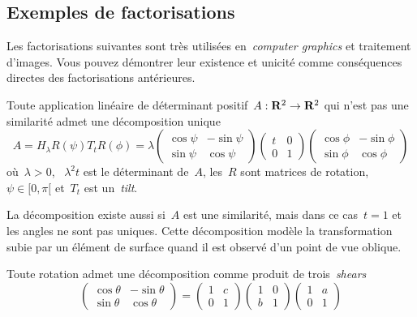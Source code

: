 \subsection{Exemples de factorisations}

Les factorisations suivantes sont très utilisées en~\emph{computer graphics}
et traitement d'images.  Vous pouvez démontrer leur existence et unicité
comme conséquences directes des factorisations antérieures.

\begin{proposition}
	Toute application linéaire de déterminant positif~$A:\mathbf{R}^2\to\mathbf{R}^2$ qui n'est
	pas une similarité admet une décomposition unique
	\[
		A = H_\lambda R(\psi)T_tR(\phi)
		= \lambda
		\begin{pmatrix}\cos\psi & -\sin\psi\\\sin\psi & \cos\psi\end{pmatrix}
		\begin{pmatrix}t & 0 \\0 & 1\end{pmatrix}
		\begin{pmatrix}\cos\phi & -\sin\phi\\\sin\phi & \cos\phi\end{pmatrix}
	\]
	où~$\lambda>0$, ~$\lambda^2t$ est le déterminant de~$A$, les~$R$ sont
	matrices de rotation,~$\psi\in[0,\pi[$ et~$T_t$ est un~\emph{tilt}.
\end{proposition}

La décomposition existe aussi si~$A$ est une similarité, mais dans ce
cas~$t=1$ et les angles ne sont pas uniques.
Cette décomposition modèle la transformation subie par un élément de surface
quand il est observé d'un point de vue oblique.



\bigskip

\begin{proposition}
	Toute rotation admet une décomposition comme produit de trois~\emph{shears}
	\[
		\begin{pmatrix}\cos\theta & -\sin\theta\\\sin\theta & \cos\theta\end{pmatrix}
		=
		\begin{pmatrix}1&c\\0&1\end{pmatrix}
		\begin{pmatrix}1&0\\b&1\end{pmatrix}
		\begin{pmatrix}1&a\\0&1\end{pmatrix}
	\]
\end{proposition}

